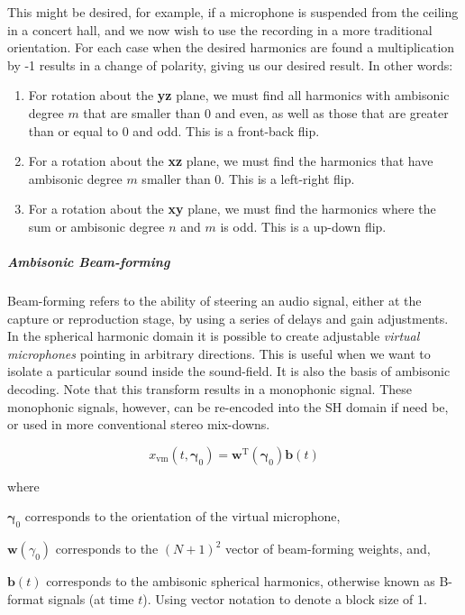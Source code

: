 This might be desired, for example, if a microphone is suspended from the ceiling in a concert hall, and we now wish to use the recording in a more traditional orientation. For each case when the desired harmonics are found a multiplication by -1 results in a change of polarity, giving us our desired result. In other words:

\begin{enumerate}
    \item For rotation about the \textbf{yz} plane, we must find all harmonics with ambisonic degree $m$ that are smaller than 0 and even, as well as those that are greater than or equal to 0 and odd. This is a front-back flip.
    \item For a rotation about the \textbf{xz} plane, we must find the harmonics that have ambisonic degree $m$ smaller than 0.  This is a left-right flip.
    \item For a rotation about the \textbf{xy} plane, we must find the harmonics where the sum or ambisonic degree $n$ and $m$ is odd.  This is a up-down flip.
\end{enumerate}

\subparagraph{Ambisonic Beam-forming}

Beam-forming refers to the ability of steering an audio signal, either at the capture or reproduction stage, by using a series of delays and gain adjustments. In the spherical harmonic domain it is possible to create adjustable \textit{virtual microphones} pointing in arbitrary directions. This is useful when we want to isolate a particular sound inside the sound-field. It is also the basis of ambisonic decoding. Note that this transform results in a monophonic signal. These monophonic signals, however, can be re-encoded into the SH domain if need be, or used in more conventional stereo mix-downs.

\begin{equation}
x_{\mathrm{vm}}\left(t, \boldsymbol{\gamma}_{0}\right)=\mathbf{w}^{\mathrm{T}}\left(\boldsymbol{\gamma}_{0}\right) \mathbf{b}(t)
\label{eq:ambi-beamform}
\end{equation}

\noindent where
\begin{description}
\item  $\boldsymbol{\gamma}_{0}$ corresponds to the orientation of the virtual microphone,
\item  $\mathbf{w}(\gamma_{0})$ corresponds to the $(N+1)^{2}$ vector of beam-forming weights, and,
\item  $\mathbf{b}(t)$ corresponds to the ambisonic spherical harmonics, otherwise known as B-format signals (at time $t$). Using vector notation to denote a block size of 1.
\end{description}

